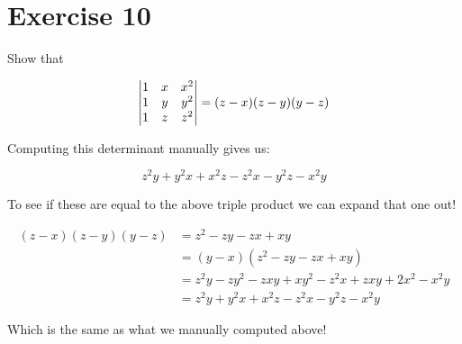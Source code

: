 \section*{Exercise 10}

Show that 

\[
	\genericmat{v}{
		1&x&x^2\\
		1&y&y^2\\
		1&z&z^2
	} =
	(z-x)(z-y)(y-z)
\]

Computing this determinant manually gives us:

\[
	z^2y + y^2x + x^2z - z^2x - y^2z - x^2y
\]

To see if these are equal to the above triple product we can expand that one out!

\[
	\begin{aligned}
		(z-x)(z-y)(y-z) &= z^2 - zy - zx + xy \\
		&= (y-x)(z^2 - zy - zx + xy) \\
		&= z^2y - zy^2 - zxy + xy^2 - z^2x + zxy + 2x^2 - x^2y \\
		&= z^2y + y^2x + x^2z - z^2x - y^2z - x^2y
	\end{aligned}
\]

Which is the same as what we manually computed above! 
